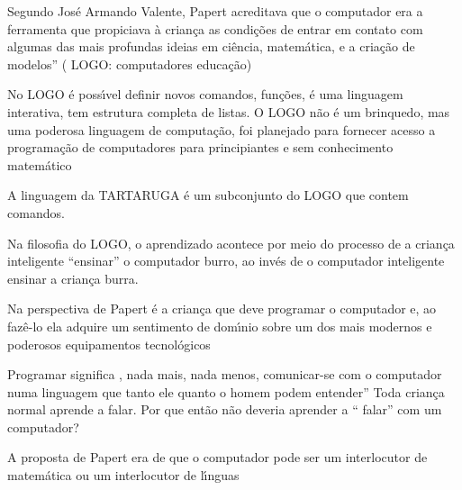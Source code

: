 \documentclass[
12pt,		%
openright,	%
twoside,  %
a4paper,			%
chapter=TITLE,		%
english,			%
french,				%
spanish,			%
brazil				%
]{USPSC-classe/USPSC_RedarTex}
\begin{document}
Segundo Jos\'e Armando Valente, Papert acreditava que o computador era a ferramenta que propiciava \`a crian\c{c}a as condi\c{c}\~oes de entrar em contato com algumas das mais profundas ideias em ci\^encia, matem\'atica, e a cria\c{c}\~ao de modelos” ( LOGO: computadores  educa\c{c}\~ao)








 No LOGO \'e poss\'{\i}vel definir novos comandos, fun\c{c}\~oes, \'e uma linguagem interativa, tem estrutura completa de listas.  O LOGO n\~ao \'e um brinquedo,  mas uma poderosa linguagem de computa\c{c}\~ao, foi planejado para fornecer acesso a programa\c{c}\~ao de computadores para principiantes e sem conhecimento matem\'atico








A linguagem da TARTARUGA \'e um subconjunto do LOGO que contem comandos.








Na filosofia do LOGO, o aprendizado acontece por meio do  processo de a crian\c{c}a inteligente “ensinar” o computador burro, ao inv\'es de o  computador inteligente ensinar a crian\c{c}a burra.








Na perspectiva de Papert \'e a crian\c{c}a que deve programar o computador e, ao faz\^e-lo ela adquire um sentimento de dom\'{\i}nio sobre um dos mais  modernos e poderosos equipamentos tecnol\'ogicos








Programar significa , nada mais, nada menos, comunicar-se com o computador numa linguagem que tanto ele quanto o homem podem entender” Toda crian\c{c}a normal aprende a falar.  Por que ent\~ao n\~ao deveria aprender a “ falar” com um computador?








A proposta de Papert era de que  o computador pode ser um interlocutor  de matem\'atica ou um interlocutor de l\'{\i}nguas
\end{document}
